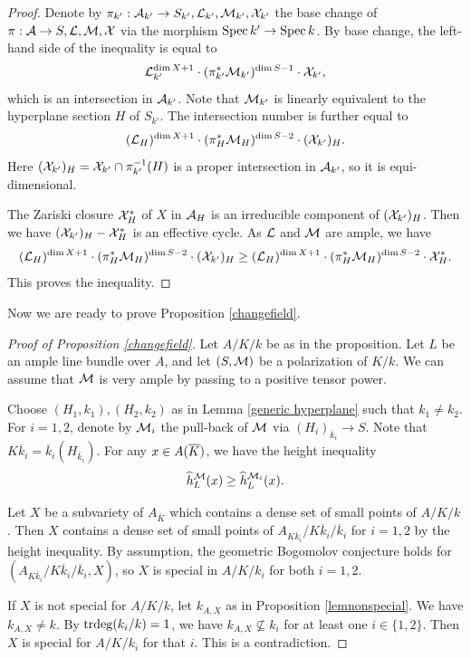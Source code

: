 \begin{proof}
Denote by $\pi_{k'}:{\mathcal A}_{k'}\to S_{k'},{\mathcal L}_{k'},{\mathcal M}_{k'}, {\mathcal X}_{k'}$ the base change of $\pi:{\mathcal A}\to S,{\mathcal L},{\mathcal M}, {\mathcal X}$ via the morphism ${\rm Spec \,} k'\to {\rm Spec \,} k$.
By base change, the left-hand side of the inequality is equal to
$$
{\mathcal L}_{k'}^{\dim X+1}\cdot (\pi_{k'}^*{\mathcal M}_{k'})^{\dim S-1} \cdot {\mathcal X}_{k'},$$
which is an intersection in ${\mathcal A}_{k'}$.
Note that ${\mathcal M}_{k'}$ is linearly equivalent to the hyperplane section $H$ of $S_{k'}$.
The intersection number is further equal to
$$({\mathcal L}_H)^{\dim X+1}\cdot (\pi_H^*{\mathcal M}_H)^{\dim S-2} \cdot ({\mathcal X}_{k'})_H.$$
Here $({\mathcal X}_{k'})_H= {\mathcal X}_{k'}\cap \pi_{k'}^{-1}(H)$ is a proper intersection in ${\mathcal A}_{k'}$, so it is equi-dimensional.

The Zariski closure ${\mathcal X}_H^*$ of $X$ in ${\mathcal A}_H$ is an irreducible component of $({\mathcal X}_{k'})_H$.
Then we have $({\mathcal X}_{k'})_H- {\mathcal X}_H^*$ is an effective cycle.
As ${\mathcal L}$ and ${\mathcal M}$ are ample, we have
$$({\mathcal L}_H)^{\dim X+1}\cdot (\pi_H^*{\mathcal M}_H)^{\dim S-2} \cdot ({\mathcal X}_{k'})_H
\geq ({\mathcal L}_H)^{\dim X+1}\cdot (\pi_H^*{\mathcal M}_H)^{\dim S-2} \cdot {\mathcal X}_H^*.$$
This proves the inequality.
\end{proof}


Now we are ready to prove Proposition \ref{changefield}.

\begin{proof}[Proof of Proposition \ref{changefield}]
Let $A/K/k$ be as in the proposition.
Let $L$ be an ample line bundle over $A$, and let $(S,{\mathcal M})$ be a polarization of $K/k$.
We can assume that ${\mathcal M}$ is very ample by passing to a positive tensor power.

Choose $(H_1,k_1), (H_2,k_2)$ as in Lemma \ref{generic hyperplane} such that $k_1\neq k_2$.
For $i=1,2$, denote by ${\mathcal M}_i$ the pull-back of ${\mathcal M}$ via $(H_i)_{{\overline k_i}}\to S$.
Note that $K{\overline k_i}={\overline k_i}(H_{{\overline k_i}}).$
For any $x\in A({\overline{K}})$, we have the height inequality
$$
\widehat h_L^{{\mathcal M}}(x)\geq \widehat h_L^{{\mathcal M}_i}(x).
$$

Let $X$ be a subvariety of $A_{\overline{K}}$ which contains a dense set of small points of $A/K/k$.
Then $X$ contains a dense set of small points of $A_{K{\overline k_i}}/K{\overline k_i}/{\overline k_i}$
for $i=1,2$ by the height inequality.
By assumption, the geometric Bogomolov conjecture holds for $(A_{K{\overline k_i}}/K{\overline k_i}/{\overline k_i}, X)$, so $X$ is special in $A/K/k_i$ for both $i=1,2.$

If $X$ is not special for $A/K/k$, let $k_{A,X}$ as in Proposition \ref{lemnonspecial}. We have $k_{A,X}\neq k.$
By ${\mathrm{trdeg}}(k_i/k)=1$, we have $k_{A,X}\not\subseteq k_i$ for at least one $i\in \{1,2\}$.
Then $X$ is special for $A/K/k_i$ for that $i$.
This is a contradiction.
\end{proof}
